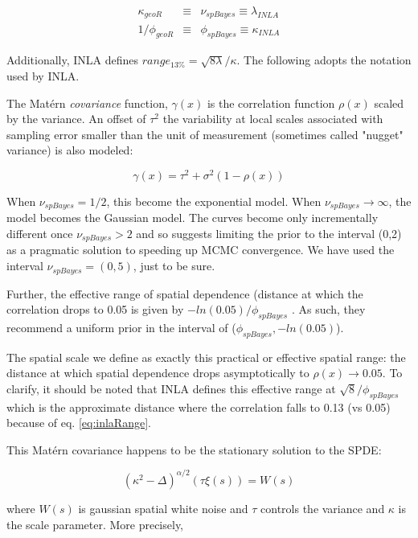 \documentclass[letterpaper,portrait,11pt]{scrartcl}
\numberwithin{equation}{section}		%
\numberwithin{figure}{section}		%
\numberwithin{table}{section}				%
\begin{document}
\begin{appendices}
\begin{eqnarray}
  \kappa_{geoR} &\equiv& \nu_{spBayes}  \equiv  \lambda_{INLA} \\
  1/\phi_{geoR} &\equiv& \phi_{spBayes} \equiv \kappa_{INLA}
\end{eqnarray}


Additionally, INLA defines $range_{13\%} = \sqrt{8 \lambda} / \kappa$. The following adopts the notation used by INLA.



The Mat\'{e}rn \textit{covariance} function, $\gamma(x)$ is the correlation function $\rho(x)$ scaled by the variance. An offset of $\tau^2$ the variability at local scales associated with sampling error smaller than the unit of measurement (sometimes called "nugget" variance) is also modeled:

\begin{equation}
\gamma(x) = \tau^2 + \sigma^2 ( 1- \rho(x)) 
\end{equation}


When $\nu_{spBayes} = 1/2$, this become the exponential model. When $\nu_{spBayes}  \rightarrow \infty$, the model becomes the Gaussian model. The curves become only incrementally different once $\nu_{spBayes} > 2$ and so \textcite{finley:2007} suggests limiting the prior to the interval (0,2) as a pragmatic solution to speeding up MCMC convergence. We have used the interval $\nu_{spBayes}= (0,5)$, just to be sure. 

Further, the effective range of spatial dependence (distance at which the correlation drops to 0.05 is given by $-ln(0.05)/\phi_{spBayes}$ \parencite{finley:2007}. As such, they recommend a uniform prior in the interval of ($\phi_{spBayes}, -ln(0.05)$). 

The spatial scale we define as exactly this practical or effective spatial range: the distance at which spatial dependence drops asymptotically to $\rho(x) \rightarrow 0.05$. To clarify, it should be noted that INLA defines this effective range at $\sqrt{8}/\phi_{spBayes}$ which is the approximate distance where the correlation falls to 0.13 (vs 0.05) because of eq. \ref{eq:inlaRange}. 

This Mat\'{e}rn covariance happens to be the stationary solution to the SPDE:

\begin{equation}
(\kappa^2 - \Delta)^{\alpha/2} ( \tau \xi(s)) = W(s)
\end{equation}

where $W(s)$ is gaussian spatial white noise and $\tau$ controls the variance and $\kappa$ is the scale parameter. More precisely,


\end{appendices}
\end{document}
